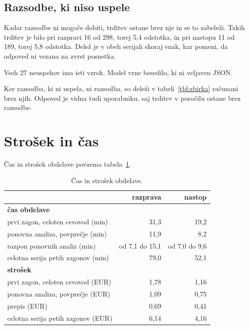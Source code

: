 \documentclass[a4paper, 12pt]{book}
\begin{document}
\subsection{Razsodbe, ki niso uspele}
\label{ssec:neuspele}

Kadar razsodbe ni mogoče dobiti, trditev ostane brez nje in se to zabeleži.
Takih trditev je bilo pri razpravi 16 od 298, torej 5,4 odstotka, in pri nastopu
11 od 189, torej 5,8 odstotka. Delež je v obeh serijah skoraj enak, kar pomeni,
da odpoved ni vezana na zvrst posnetka.

Vseh 27 neuspehov ima isti vzrok. Model vrne besedilo, ki ni veljaven JSON.

Ker razsodba, ki ni uspela, ni razsodba, so deleži v tabeli~\ref{tbl:zbirka} računani brez njih. Odpoved je vidna tudi uporabniku, saj trditev v poročilu
ostane brez razsodbe.

\section{Strošek in čas}
\label{sec:strosek-cas}

Čas in strošek obdelave povzema tabela~\ref{tbl:strosek}.

\begin{table}[htbp]
\centering
\begin{tabular}{lrr}
\toprule
& razprava & nastop \\
\midrule
\multicolumn{3}{l}{\textbf{čas obdelave}} \\
prvi zagon, celoten cevovod (min)   & 31,3 & 19,2 \\
ponovna analiza, povprečje (min)    & 11,9 & 8,2 \\
razpon ponovnih analiz (min)        & od 7,1 do 15,1 & od 7,0 do 9,6 \\
celotna serija petih zagonov (min)  & 79,0 & 52,1 \\
\midrule
\multicolumn{3}{l}{\textbf{strošek}} \\
prvi zagon, celoten cevovod (EUR)   & 1,78 & 1,16 \\
ponovna analiza, povprečje (EUR)    & 1,09 & 0,75 \\
prepis (EUR)                        & 0,69 & 0,41 \\
celotna serija petih zagonov (EUR)  & 6,14 & 4,16 \\
\bottomrule
\end{tabular}
\caption{Čas in strošek obdelave.}
\label{tbl:strosek}
\end{table}
\end{document}
